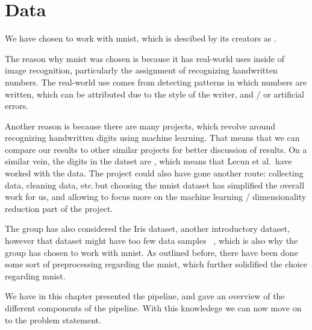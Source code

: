 \section{Data}\label{sec:data}
We have chosen to work with \gls{mnist}, which is descibed by its creators as
.


The reason why \gls{mnist} was chosen is because it has real-world uses inside of image recognition, particularly the assignment of recognizing handwritten numbers. The real-world use comes from detecting patterns in which numbers are written, which can be attributed due to the style of the writer, and / or artificial errors.


Another reason is because there are many projects, which revolve around recognizing handwritten digits using machine learning. That means that we can compare our results to other similar projects for better discussion of results. On a similar vein, the digits in the datset are , which means that Lecun et al.\ have worked with the data. The project could also have gone another route: collecting data, cleaning data, etc.\,but choosing the \gls{mnist} dataset has simplified the overall work for us, and allowing to focus more on the machine learning / dimensionality reduction part of the project. 


The group has also considered the Iris dataset, another introductory dataset, however that dataset might have too few data samples ~\cite{mnist-vs-iris}, which is also why the group has chosen to work with \gls{mnist}. As outlined before, there have been done some sort of preprocessing regarding the \gls{mnist}, which further solidified the choice regarding \gls{mnist}.


We have in this chapter presented the pipeline, and gave an overview of the different components of the pipeline. With this knowledege we can now move on to the problem statement.

